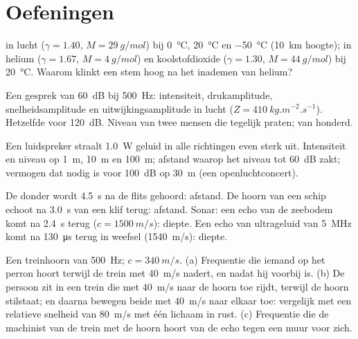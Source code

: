 \section{Oefeningen}

\begin{exercise}[$\star$]\label{exo:b2:sound-waves:1}
 in lucht ($\gamma = 1.40$, $M = \qty{29}{g/mol}$) bij
\qty{0}{\degreeCelsius}, \qty{20}{\degreeCelsius} en
\qty{-50}{\degreeCelsius} (\qty{10}{km} hoogte); in helium ($\gamma = 1.67$,
$M = \qty{4}{g/mol}$) en koolstofdioxide ($\gamma = 1.30$,
$M = \qty{44}{g/mol}$) bij \qty{20}{\degreeCelsius}. Waarom klinkt een stem
hoog na het inademen van helium?
\end{exercise}

\begin{exercise}[$\star$]\label{exo:b2:sound-waves:2}
Een gesprek van \qty{60}{dB} bij \qty{500}{Hz}: intensiteit, drukamplitude,
snelheidsamplitude en uitwijkingsamplitude in lucht
($Z = \qty{410}{kg.m^{-2}.s^{-1}}$). Hetzelfde voor \qty{120}{dB}. Niveau
van twee mensen die tegelijk praten; van honderd.
\end{exercise}

\begin{exercise}[$\star$]\label{exo:b2:sound-waves:3}
Een luidspreker straalt \qty{1.0}{W} geluid in alle richtingen even sterk
uit. Intensiteit en niveau op \qty{1}{m}, \qty{10}{m} en \qty{100}{m};
afstand waarop het niveau tot \qty{60}{dB} zakt; vermogen dat nodig is voor
\qty{100}{dB} op \qty{30}{m} (een openluchtconcert).
\end{exercise}

\begin{exercise}[$\star$]\label{exo:b2:sound-waves:4}
De donder wordt \qty{4.5}{s} na de flits gehoord: afstand. De hoorn van een
schip echoot na \qty{3.0}{s} van een klif terug: afstand. Sonar: een echo
van de zeebodem komt na \qty{2.4}{s} terug ($c = \qty{1500}{m/s}$): diepte.
Een echo van ultrageluid van \qty{5}{MHz} komt na \qty{130}{\micro s} terug
in weefsel (\qty{1540}{m/s}): diepte.
\end{exercise}

\begin{exercise}[$\star\star$]\label{exo:b2:sound-waves:5}
Een treinhoorn van \qty{500}{Hz}; $c = \qty{340}{m/s}$. (a) Frequentie die
iemand op het perron hoort terwijl de trein met \qty{40}{m/s} nadert, en
nadat hij voorbij is. (b) De persoon zit in een trein die met \qty{40}{m/s}
naar de hoorn toe rijdt, terwijl de hoorn stilstaat; en daarna bewegen beide
met \qty{40}{m/s} naar elkaar toe: vergelijk met een relatieve snelheid van
\qty{80}{m/s} met één lichaam in rust. (c) Frequentie die de machinist van
de trein met de hoorn hoort van de echo tegen een muur voor zich.
\end{exercise}

